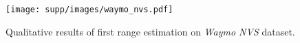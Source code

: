 \begin{figure}[t]
\centering
\texttt{[image: supp/images/waymo\_nvs.pdf]}

\caption{Qualitative results of first range estimation on \textit{Waymo NVS} dataset.}
\label{fig:supp_waymo_nvs}

\end{figure}